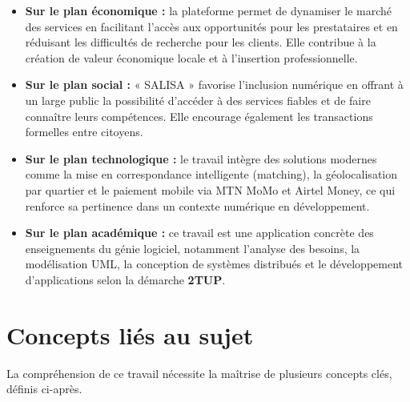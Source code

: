 \begin{itemize}
	\item[\textbf{-}] \textbf{Sur le plan économique :} la plateforme permet de dynamiser le marché des services en facilitant l'accès aux opportunités pour les prestataires et en réduisant les difficultés de recherche pour les clients. Elle contribue à la création de valeur économique locale et à l'insertion professionnelle.
	
	\item[\textbf{-}] \textbf{Sur le plan social :} « SALISA » favorise l'inclusion numérique en offrant à un large public la possibilité d'accéder à des services fiables et de faire connaître leurs compétences. Elle encourage également les transactions formelles entre citoyens.
	
	\item[\textbf{-}] \textbf{Sur le plan technologique :} le travail intègre des solutions modernes comme la mise en correspondance intelligente (matching), la géolocalisation par quartier et le paiement mobile via MTN MoMo et Airtel Money, ce qui renforce sa pertinence dans un contexte numérique en développement.
	
	\item[\textbf{-}] \textbf{Sur le plan académique :} ce travail est une application concrète des enseignements du génie logiciel, notamment l'analyse des besoins, la modélisation UML, la conception de systèmes distribués et le développement d'applications selon la démarche \textbf{2TUP}.
\end{itemize}

\section{Concepts liés au sujet}

La compréhension de ce travail nécessite la maîtrise de plusieurs concepts clés, définis ci-après.

